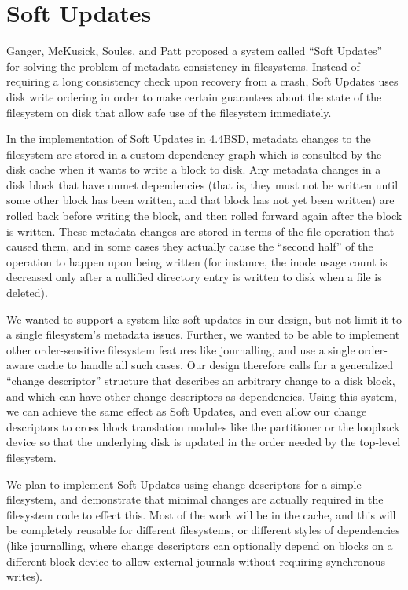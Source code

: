 \section{Soft Updates}
\label{sec:softupdates}

Ganger, McKusick, Soules, and Patt proposed a system called ``Soft
Updates''~\cite{ganger00soft} for solving the problem of metadata
consistency in filesystems. Instead of requiring a long consistency
check upon recovery from a crash, Soft Updates uses disk write
ordering in order to make certain guarantees about the state of the
filesystem on disk that allow safe use of the filesystem immediately.

In the implementation of Soft Updates in 4.4BSD, metadata changes to
the filesystem are stored in a custom dependency graph which is
consulted by the disk cache when it wants to write a block to disk.
Any metadata changes in a disk block that have unmet dependencies
(that is, they must not be written until some other block has been
written, and that block has not yet been written) are rolled back
before writing the block, and then rolled forward again after the
block is written. These metadata changes are stored in terms of the
file operation that caused them, and in some cases they actually cause
the ``second half'' of the operation to happen upon being written (for
instance, the inode usage count is decreased only after a nullified
directory entry is written to disk when a file is deleted).

We wanted to support a system like soft updates in our design, but not
limit it to a single filesystem's metadata issues. Further, we wanted
to be able to implement other order-sensitive filesystem features like
journalling, and use a single order-aware cache to handle all such
cases. Our design therefore calls for a generalized ``change
descriptor'' structure that describes an arbitrary change to a disk
block, and which can have other change descriptors as dependencies.
Using this system, we can achieve the same effect as Soft Updates, and
even allow our change descriptors to cross block translation modules
like the partitioner or the loopback device so that the underlying
disk is updated in the order needed by the top-level filesystem.

We plan to implement Soft Updates using change descriptors for a
simple filesystem, and demonstrate that minimal changes are actually
required in the filesystem code to effect this. Most of the work will
be in the cache, and this will be completely reusable for different
filesystems, or different styles of dependencies (like journalling,
where change descriptors can optionally depend on blocks on a
different block device to allow external journals without requiring
synchronous writes).
